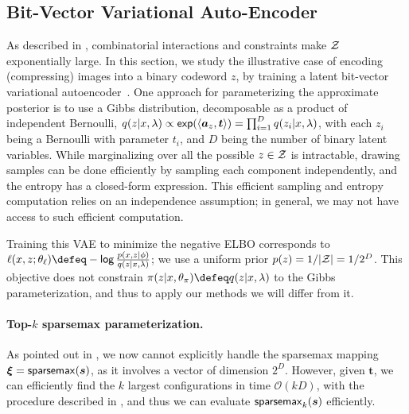 \subsection{Bit-Vector Variational Auto-Encoder}\label{sec:bernvae}

\noindent As described in ,
combinatorial interactions and constraints make $\mathcal{Z}$ exponentially
large. In this section, we study the illustrative case of encoding
(compressing) images into a binary codeword $z$, by training a latent
bit-vector variational autoencoder~\citep{GumbelSoftmax,
    mnih2014neural}. One approach for parameterizing the approximate
posterior is to use a Gibbs distribution, decomposable as a product
of independent Bernoulli, $q(z |x, \lambda) \propto
    \operatorname*{\mathsf{exp}}(\langle\bm{a}_z,\bm{t}\rangle) = \prod_{i=1}^D q(z_i |x, \lambda)$,
with each $z_i$ being a Bernoulli with parameter $t_i$, and $D$ being
the number of binary latent variables. While marginalizing over all the
possible $z \in \mathcal{Z}$ is intractable, drawing samples can be done
efficiently by sampling each component independently, and the entropy
has a closed-form expression.
This efficient sampling and entropy computation relies on an independence
assumption; in general, we may not have access to such efficient
computation.

\begin{sloppypar}
    Training this VAE to minimize the negative ELBO corresponds to
    $\ell(x, z; \theta_\ell) \defeq - \log \frac{p(x, z | \phi)}{q(z | x,
            \lambda)} $; we use a uniform prior $p(z)=1/|\mathcal{Z}|=1/{2^D}$. This
    objective does not constrain $\pi(z| x,\theta_\pi) \defeq q(z |x,
        \lambda)$ to the Gibbs parameterization, and thus to apply our
    methods we will differ from it.
\end{sloppypar}

\paragraph*{Top-{\boldmath $k$} sparsemax parameterization.} As pointed
out in , we now cannot explicitly handle the
sparsemax mapping $\bm{\xi} = \operatorname*{\mathsf{sparsemax}}(\bm{s})$, as it
involves a vector of dimension $2^D$. However, given $\bm{t}$, we can
efficiently find the $k$ largest configurations in time
$\mathcal{O}(kD)$, with the procedure described in
, and thus we can evaluate $\operatorname{\mathsf{sparsemax}_\text{$k$}}(\bm{s})$
efficiently.

